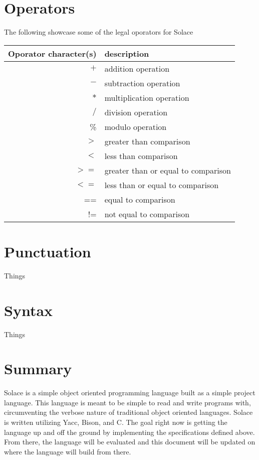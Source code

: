 \documentclass{article}
\begin{document}
\section{Operators}
The following showcase some of the legal oporators for Solace

\begin{tabular}{r|l}
Oporator character(s) & description \\
\hline
\hline
$+$ & addition operation \\
$-$ & subtraction operation \\
$*$ & multiplication operation \\
$/$ & division operation \\
\% & modulo operation \\
$>$ & greater than comparison \\
$<$ & less than comparison \\
$>=$ & greater than or equal to comparison \\
$<=$ & less than or equal to comparison \\
== & equal to comparison \\
!= & not equal to comparison \\
\hline
\end{tabular}

\section{Punctuation}
Things


\section{Syntax}
Things


\section{Summary}
Solace is a simple object oriented programming language built as a simple project language.
This language is meant to be simple to read and write programs with, circumventing the verbose
nature of traditional object oriented languages. Solace is written utilizing Yacc, Bison, and C.
The goal right now is getting the language up and off the ground by implementing the specifications
defined above. From there, the language will be evaluated and this document will be updated on
where the language will build from there.
\end{document}
